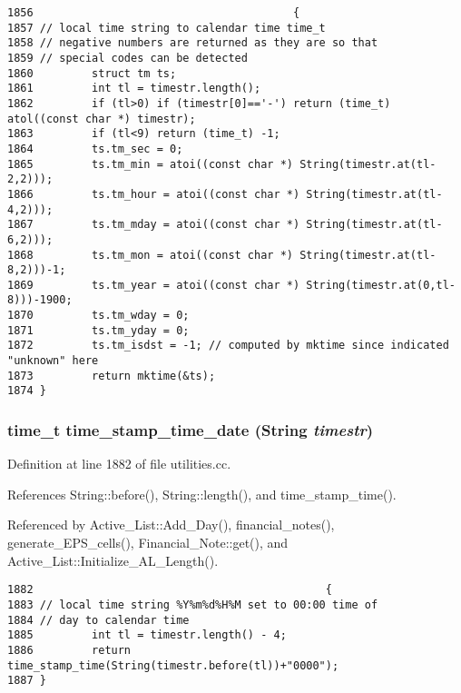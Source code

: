 \footnotesize\begin{verbatim}1856                                        {
1857 // local time string to calendar time time_t
1858 // negative numbers are returned as they are so that
1859 // special codes can be detected
1860         struct tm ts;
1861         int tl = timestr.length();
1862         if (tl>0) if (timestr[0]=='-') return (time_t) atol((const char *) timestr);
1863         if (tl<9) return (time_t) -1;
1864         ts.tm_sec = 0;
1865         ts.tm_min = atoi((const char *) String(timestr.at(tl-2,2)));
1866         ts.tm_hour = atoi((const char *) String(timestr.at(tl-4,2)));
1867         ts.tm_mday = atoi((const char *) String(timestr.at(tl-6,2)));
1868         ts.tm_mon = atoi((const char *) String(timestr.at(tl-8,2)))-1;
1869         ts.tm_year = atoi((const char *) String(timestr.at(0,tl-8)))-1900;
1870         ts.tm_wday = 0;
1871         ts.tm_yday = 0;
1872         ts.tm_isdst = -1; // computed by mktime since indicated "unknown" here
1873         return mktime(&ts);
1874 }
\end{verbatim}\normalsize 
{}
\subsubsection{\setlength{\rightskip}{0pt plus 5cm}time\_\-t time\_\-stamp\_\-time\_\-date ({\bf String} {\em timestr})}\label{dil2al_8hh_a223}




Definition at line 1882 of file utilities.cc.

References String::before(), String::length(), and time\_\-stamp\_\-time().

Referenced by Active\_\-List::Add\_\-Day(), financial\_\-notes(), generate\_\-EPS\_\-cells(), Financial\_\-Note::get(), and Active\_\-List::Initialize\_\-AL\_\-Length().



\footnotesize\begin{verbatim}1882                                             {
1883 // local time string %Y%m%d%H%M set to 00:00 time of
1884 // day to calendar time
1885         int tl = timestr.length() - 4;
1886         return time_stamp_time(String(timestr.before(tl))+"0000");
1887 }
\end{verbatim}\normalsize 
{}

